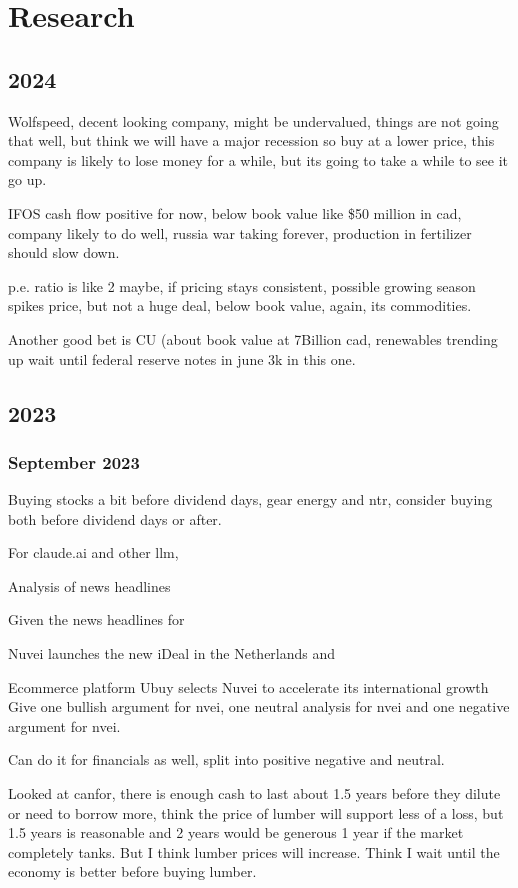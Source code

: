 \chapter{Research}


\section{2024}

Wolfspeed, decent looking company, might be undervalued, things are not going that well, but think we will have a major recession so buy at a lower price, this company is likely to lose money for a while, but its going to take a while to see it go up.


IFOS cash flow positive for now, below book value like \$50 million in cad, company likely to do well, russia war taking forever, production in fertilizer should slow down.

p.e. ratio is like 2 maybe, if pricing stays consistent, possible growing season spikes price, but not a huge deal, below book value, again, its commodities.

Another good bet is CU (about book value at 7Billion cad, renewables trending up wait until federal reserve notes in june 3k in this one.
\section{2023}

\subsection{September 2023}

Buying stocks a bit before dividend days, gear energy and ntr, consider buying both before dividend days or after.

For claude.ai and other llm,

Analysis of news headlines

Given the news headlines for

Nuvei launches the new iDeal in the Netherlands
and

Ecommerce platform Ubuy selects Nuvei to accelerate its international growth
Give one bullish argument for nvei, one neutral analysis for nvei and one negative argument for nvei.

Can do it for financials as well, split into positive negative and neutral.


Looked at canfor, there is enough cash to last about 1.5 years before they dilute or need to borrow more, think the price of lumber will support less of a loss, but 1.5 years is reasonable and 2 years would be generous 1 year if the market completely tanks. But I think lumber prices will increase. Think I wait until the economy is better before buying lumber.

